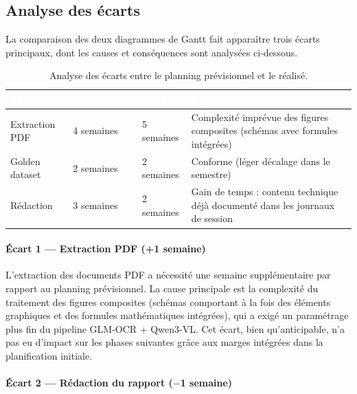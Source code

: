 \documentclass[11pt,a4paper]{article}
\begin{document}
\subsection{Analyse des écarts}
\label{sec:ecarts}

La comparaison des deux diagrammes de Gantt fait apparaître trois écarts principaux, dont les causes et conséquences sont analysées ci-dessous.

\begin{table}[H]
\centering
\begin{tabularx}{\linewidth}{L{3cm} L{2.5cm} L{2.5cm} L{4cm}}
\toprule
{}
\textcolor{white}{\textbf{Tâche}} &
\textcolor{white}{\textbf{Prévisionnel}} &
\textcolor{white}{\textbf{Réalisé}} &
\textcolor{white}{\textbf{Explication}} \\
\midrule
Extraction PDF   & 4 semaines  & 5 semaines  & Complexité imprévue des figures composites (schémas avec formules intégrées) \\
Golden dataset   & 2 semaines  & 2 semaines  & Conforme (léger décalage dans le semestre) \\
Rédaction        & 3 semaines  & 2 semaines  & Gain de temps : contenu technique déjà documenté dans les journaux de session \\
\bottomrule
\end{tabularx}
\caption{Analyse des écarts entre le planning prévisionnel et le réalisé.}
\label{tab:ecarts}
\end{table}

\paragraph{Écart 1 --- Extraction PDF (+1 semaine)}

L'extraction des documents PDF a nécessité une semaine supplémentaire par rapport au planning prévisionnel. La cause principale est la complexité du traitement des figures composites (schémas comportant à la fois des éléments graphiques et des formules mathématiques intégrées), qui a exigé un paramétrage plus fin du pipeline GLM-OCR + Qwen3-VL. Cet écart, bien qu'anticipable, n'a pas eu d'impact sur les phases suivantes grâce aux marges intégrées dans la planification initiale.

\paragraph{Écart 2 --- Rédaction du rapport ($-$1 semaine)}
\end{document}
